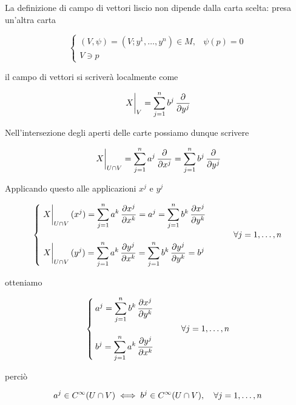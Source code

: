 La definizione di campo di vettori liscio non dipende dalla carta scelta: presa un'altra carta

\begin{equation}
	\begin{cases}
		(V,\psi) = (V; y^{1},\dots,y^{n}) \in M, & \psi(p) = 0 \\
		V \ni p
	\end{cases}
\end{equation}

il campo di vettori si scriverà localmente come

\begin{equation}
	\eval{X}_{V} = \sum_{j=1}^{n} b^{j} \, \pdv{y^{j}}
\end{equation}

Nell'intersezione degli aperti delle carte possiamo dunque scrivere

\begin{equation}
	\eval{X}_{U \cap V} = \sum_{j=1}^{n} a^{j} \, \pdv{x^{j}} = \sum_{j=1}^{n} b^{j} \, \pdv{y^{j}}
\end{equation}

Applicando questo alle applicazioni $ x^{j} $ e $ y^{j} $

\begin{equation}
	\begin{cases}
		\displaystyle \eval{X}_{U \cap V} (x^{j}) = \sum_{j=1}^{n} a^{k} \, \pdv{x^{j}}{x^{k}} = a^{j} = \sum_{j=1}^{n} b^{k} \, \pdv{x^{j}}{y^{k}} \\ \\
		\displaystyle \eval{X}_{U \cap V} (y^{j}) = \sum_{j=1}^{n} a^{k} \, \pdv{y^{j}}{x^{k}} = \sum_{j=1}^{n} b^{k} \, \pdv{y^{j}}{y^{k}} = b^{j}
	\end{cases} %
	\qquad \forall j=1,\dots,n
\end{equation}

otteniamo

\begin{equation}
	\begin{cases}
		\displaystyle a^{j} = \sum_{j=1}^{n} b^{k} \, \pdv{x^{j}}{y^{k}} \\ \\
		\displaystyle b^{j} = \sum_{j=1}^{n} a^{k} \, \pdv{y^{j}}{x^{k}}
	\end{cases} %
	\qquad \forall j=1,\dots,n
\end{equation}

perciò

\begin{equation}
	a^{j} \in C^{\infty}(U \cap V) \iff b^{j} \in C^{\infty}(U \cap V) \qcomma \forall j=1,\dots,n
\end{equation}

